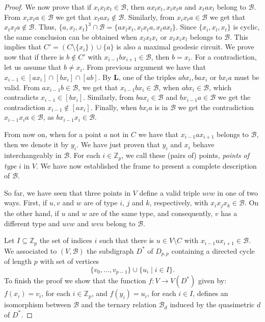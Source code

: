 \documentclass{article}
\newcommand{\Z}{\mathbb{Z}}
\newcommand{\calb}{\mathcal{B}}
\begin{document}
\begin{proof}
    We now prove that if $x_ix_lx_t\in \calb$, then $ax_lx_t, x_lx_ta$ and $x_tax_l$ belong to $\calb$. From $x_ix_ta\in \calb$ we get that  $x_lax_t\notin \calb$. Similarly, from $x_ix_ta\in \calb$ we get that $x_tx_la\notin \calb$. Thus, $\{a,x_l,x_t\}^3\cap \calb=\{ax_lx_t,x_lx_ta, x_tax_l\}$. Since $\{x_i,x_l,x_t\}$ is cyclic, the same conclusion can be obtained when $x_lx_tx_i$ or $x_tx_ix_l$ belongs to $\calb$. This implies that $C'=(C\setminus \{x_i\})\cup \{a\}$ is also a maximal geodesic circuit. We prove now that if there is $b\notin C'$ with $x_{i-1}bx_{i+1}\in \calb$, then $b=x_i$. For a contradiction, let us assume that $b\neq x_i$. From previous argument we have that $x_{i-1}\in [ax_i]\cap [bx_i]\cap [ab]$. By \textbf{L}, one of the triples $abx_i,bax_i$ or $bx_ia$ must be valid. From $ax_{i-1}b\in\calb$, we get that $x_{i-1}bx_i\in \calb$, when $abx_i\in \calb$, which contradicts $x_{i-1}\in [bx_i]$. Similarly, from $bax_i\in \calb$  and  $bx_{i-1}a\in\calb$ we get the contradiction $x_{i-1}\notin [ax_i]$. Finally, when $bx_ia$ is in $\calb$ we get the contradiction $x_{i-1}x_ia\in \calb$, as $bx_{i-1}x_i\in \calb$. 
    
	From now on, when for a point $a$ not in $C$ we have that $x_{i-1}ax_{i+1}$ belongs to $\calb$, then we denote it by $y_i$. We have just proven that $y_i$ and $x_i$ behave interchangeably in $\calb$. For each $i \in \Z_p$, we call these (pairs of) points, \textit{points of type} $i$ in $V$. We have now established the frame to present a complete description of $\calb$. 
    
    So far, we have seen that three points in $V$ define a valid triple $uvw$ in one of two ways. First, if $u, v$ and $w$ are of type $i$, $j$ and $k$, respectively, with $x_ix_jx_k\in \calb$. On the other hand, if $u$ and $w$ are of the same type, and consequently, $v$ has a different type and $uvw$ and $wvu$ belong to $\calb$.

    Let $I\subseteq \Z_p$ the set of indices $i$ such that there is $u\in V\setminus C$ with $x_{i-1}ux_{i+1}\in \calb$. We associated to $(V,\calb)$ the subdigraph $D^*$ of $D_{p,p}$  containing a directed cycle of length $p$ with set of vertices 
    $$\{v_0,\ldots,v_{p-1}\}\cup \{u_i \mid i\in I\}.$$ To finish the proof we show that the function $f: V \rightarrow V(D^*)$ given by: $f(x_i) = v_i$, for each $i\in \Z_p$, and $f(y_i)=u_i$, for each $i\in I$, defines an isomorphism between $\calb$ and the ternary relation $\calb_d$ induced by the quasimetric $d$ of $D^*$. 
    

\end{proof}
\end{document}
